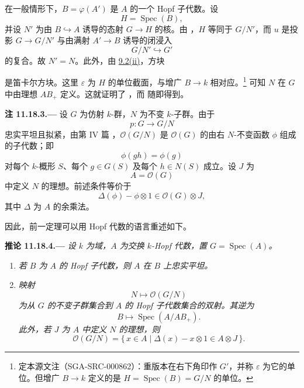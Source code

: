 在一般情形下，\(B=\varphi(A')\) 是 \(A\) 的一个 Hopf 子代数。设
\[
  H=\operatorname{Spec}(B),
\]
并设 \(N'\) 为由 \(B\hookrightarrow A\) 诱导的态射 \(G\to H\) 的核。由 \textup{}，\(H\) 等同于 \(G/N'\)，而 \(u\) 是投影 \(G\to G/N'\) 与由满射 \(A'\to B\) 诱导的闭浸入
\[
  G/N'\hookrightarrow G'
\]
的复合。故 \(N'=N\)。此外，由 \hyperref[concl:sga3-VIB-9.2-ii]{9.2\textup{(ii)}}，方块
\begin{center}
  \label{diag:sga3-VIB-11.18.2-cartesian}%
\end{center}
是笛卡尔方块。这里 \(\varepsilon\) 为 \(H\) 的单位截面，与增广 \(B\to k\) 相对应。\footnote{定本源文注（SGA-SRC-000862）：重版本在右下角印作 \(G'\)，并称 \(\varepsilon\) 为它的单位。但增广 \(B\to k\) 定义的是 \(H=\operatorname{Spec}(B)=G/N\) 的单位。}
可知 \(N\) 在 \(G\) 中由理想 \(AB_+\) 定义。这就证明了 \textup{}，而 \textup{} 随即得到。

\medskip
{}\label{rem:sga3-VIB-11.18.3}%
\noindent\textbf{注 11.18.3.---}
设 \(G\) 为仿射 \(k\)-群，\(N\) 为不变 \(k\)-子群。由于
\[
  p:G\longrightarrow G/N
\]
忠实平坦且拟紧，由第 IV 篇 ，\(\mathcal O(G/N)\) 是 \(\mathcal O(G)\) 的由右 \(N\)-不变函数 \(\phi\) 组成的子代数；即
\[
  \phi(gh)=\phi(g)
\]
对每个 \(k\)-概形 \(S\)、每个 \(g\in G(S)\) 及每个 \(h\in N(S)\) 成立。设 \(J\) 为
\[
  A=\mathcal O(G)
\]
中定义 \(N\) 的理想。前述条件等价于
\label{form:sga3-VIB-11.18.3-invariants}%
\[
  \Delta(\phi)-\phi\otimes1
    \in\mathcal O(G)\otimes J,
\]
其中 \(\Delta\) 为 \(A\) 的余乘法。

因此，前一定理可以用 Hopf 代数的语言重述如下。

\medskip
{}\label{cor:sga3-VIB-11.18.4}%
\noindent\textbf{推论 11.18.4.---}
\emph{设 \(k\) 为域，\(A\) 为交换 \(k\)-Hopf 代数，置 \(G=\operatorname{Spec}(A)\)。}
\begin{enumerate}
\item[\textup{\SGAInlineRefTarget{cor:sga3-VIB-11.18.4:item:i}(i)}]
  \label{concl:sga3-VIB-11.18.4-i}%
  \emph{若 \(B\) 为 \(A\) 的 Hopf 子代数，则 \(A\) 在 \(B\) 上忠实平坦。}

\item[\textup{(ii)}]
  \label{concl:sga3-VIB-11.18.4-ii}%
  \emph{映射}
\[
    N\longmapsto\mathcal O(G/N)
  \]
  \emph{为从 \(G\) 的不变子群集合到 \(A\) 的 Hopf 子代数集合的双射。其逆为}
\[
    B\longmapsto\operatorname{Spec}(A/AB_+).
  \]
  \emph{此外，若 \(J\) 为 \(A\) 中定义 \(N\) 的理想，则}
  \label{form:sga3-VIB-11.18.4-invariant-ring}%
\[
    \mathcal O(G/N)
      =
    \{\,x\in A\mid
      \Delta(x)-x\otimes1\in A\otimes J\,\}.
  \]
\end{enumerate}
